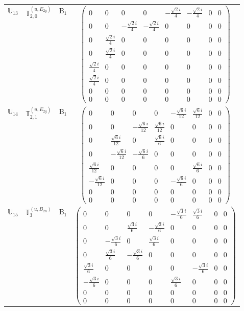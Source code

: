 \documentclass[fleqn,10pt,landscape]{article}
\begin{document}
\begin{itemize}
\begin{center}
\begin{longtable}{c|c|c|c}
$ \mathbb{U}_{13} $ & $\mathbb{T}_{2,0}^{(u,E_{2g})}$ & B$_{1}$ & $\begin{pmatrix} 0 & 0 & 0 & 0 & - \frac{\sqrt{2} i}{4} & - \frac{\sqrt{2} i}{4} & 0 & 0 \\ 0 & 0 & - \frac{\sqrt{2} i}{4} & - \frac{\sqrt{2} i}{4} & 0 & 0 & 0 & 0 \\ 0 & \frac{\sqrt{2} i}{4} & 0 & 0 & 0 & 0 & 0 & 0 \\ 0 & \frac{\sqrt{2} i}{4} & 0 & 0 & 0 & 0 & 0 & 0 \\ \frac{\sqrt{2} i}{4} & 0 & 0 & 0 & 0 & 0 & 0 & 0 \\ \frac{\sqrt{2} i}{4} & 0 & 0 & 0 & 0 & 0 & 0 & 0 \\ 0 & 0 & 0 & 0 & 0 & 0 & 0 & 0 \\ 0 & 0 & 0 & 0 & 0 & 0 & 0 & 0 \end{pmatrix}$ \\
$ \mathbb{U}_{14} $ & $\mathbb{T}_{2,1}^{(u,E_{2g})}$ & B$_{1}$ & $\begin{pmatrix} 0 & 0 & 0 & 0 & - \frac{\sqrt{6} i}{12} & \frac{\sqrt{6} i}{12} & 0 & 0 \\ 0 & 0 & - \frac{\sqrt{6} i}{12} & \frac{\sqrt{6} i}{12} & 0 & 0 & 0 & 0 \\ 0 & \frac{\sqrt{6} i}{12} & 0 & \frac{\sqrt{6} i}{6} & 0 & 0 & 0 & 0 \\ 0 & - \frac{\sqrt{6} i}{12} & - \frac{\sqrt{6} i}{6} & 0 & 0 & 0 & 0 & 0 \\ \frac{\sqrt{6} i}{12} & 0 & 0 & 0 & 0 & \frac{\sqrt{6} i}{6} & 0 & 0 \\ - \frac{\sqrt{6} i}{12} & 0 & 0 & 0 & - \frac{\sqrt{6} i}{6} & 0 & 0 & 0 \\ 0 & 0 & 0 & 0 & 0 & 0 & 0 & 0 \\ 0 & 0 & 0 & 0 & 0 & 0 & 0 & 0 \end{pmatrix}$ \\
$ \mathbb{U}_{15} $ & $\mathbb{T}_{3}^{(u,B_{2u})}$ & B$_{1}$ & $\begin{pmatrix} 0 & 0 & 0 & 0 & - \frac{\sqrt{3} i}{6} & \frac{\sqrt{3} i}{6} & 0 & 0 \\ 0 & 0 & \frac{\sqrt{3} i}{6} & - \frac{\sqrt{3} i}{6} & 0 & 0 & 0 & 0 \\ 0 & - \frac{\sqrt{3} i}{6} & 0 & \frac{\sqrt{3} i}{6} & 0 & 0 & 0 & 0 \\ 0 & \frac{\sqrt{3} i}{6} & - \frac{\sqrt{3} i}{6} & 0 & 0 & 0 & 0 & 0 \\ \frac{\sqrt{3} i}{6} & 0 & 0 & 0 & 0 & - \frac{\sqrt{3} i}{6} & 0 & 0 \\ - \frac{\sqrt{3} i}{6} & 0 & 0 & 0 & \frac{\sqrt{3} i}{6} & 0 & 0 & 0 \\ 0 & 0 & 0 & 0 & 0 & 0 & 0 & 0 \\ 0 & 0 & 0 & 0 & 0 & 0 & 0 & 0 \end{pmatrix}$ \\

\end{longtable}
\end{center}
\end{itemize}
\end{document}
